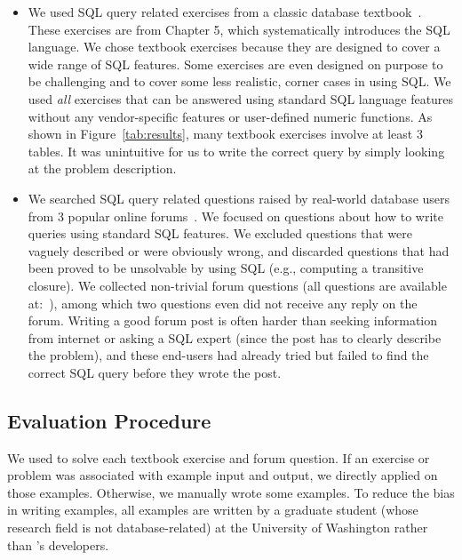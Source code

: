 \begin{itemize}
\item We used \allex SQL query related exercises
from a classic database textbook~\cite{cowbook}.
These exercises are from Chapter 5, which systematically
introduces the SQL language. We chose textbook exercises
because they are designed to
cover a wide range of SQL features. Some exercises
are even designed on purpose to be challenging and to cover some less realistic,
corner cases in using SQL. 
We used \textit{all} exercises that can be answered using standard
SQL language features without any vendor-specific
features or user-defined numeric functions.
As shown in Figure~\ref{tab:results},
many textbook exercises involve at least 3 tables. It was unintuitive
for us to write the correct query by simply looking at the problem
description.

\item We searched SQL query related questions raised by real-world
database users from 3 popular online forums~\cite{stackoverflow,
tutorialized, dbjournal}.
We focused on questions about how to write queries
using standard SQL features.
We excluded questions that were vaguely described or were obviously
wrong, and discarded questions that had been proved
to be unsolvable by using SQL (e.g., computing a
transitive closure).
We collected \pnum non-trivial forum questions
(all questions are available at:~\cite{forumq}), among which
two questions even did not receive any reply on the forum.
Writing a good forum post is often harder than seeking 
information from internet or asking
a SQL expert (since the post has to clearly 
describe the problem), and these end-users had already tried but
failed to find the correct SQL query before they wrote the post.
\end{itemize}



\vspace{-2mm}
\subsection{Evaluation Procedure}
\vspace{-1mm}

We used \ourtool to solve each textbook exercise and forum
question. If an exercise or problem
was associated with example input and output,
we directly applied \ourtool on those examples.
Otherwise, we manually wrote some examples.
To reduce the bias in writing
examples, all examples are written by a graduate
student (whose research field is not database-related) at the
University of Washington rather than
\ourtool's developers.

